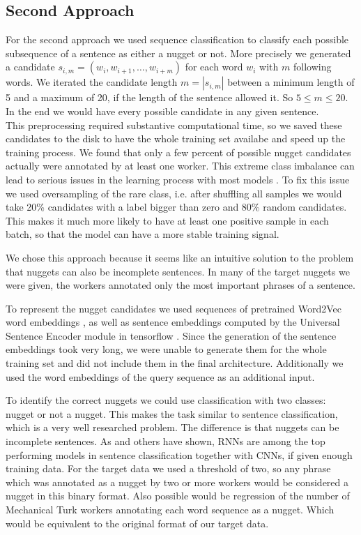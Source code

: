 \documentclass{article}
\begin{document}
 \subsection{Second Approach}
For the second approach we used sequence classification to classify each possible subsequence of a sentence as either a nugget or not. More precisely we generated a candidate $s_{i,m}=(w_i, w_{i+1}, \dots , w_{i+m})$ for each word $w_i$ with $m$ following words. We iterated the candidate length $m=|s_{i,m}|$ between a minimum length of 5 and a maximum of 20, if the length of the sentence allowed it. So $5 \leq m \leq 20$. In the end we would have every possible candidate in any given sentence. \\
This preprocessing required substantive computational time, so we saved these candidates to the disk to have the whole training set availabe and speed up the training process. We found that only a few percent of possible nugget candidates actually were annotated by at least one worker. This extreme class imbalance can lead to serious issues in the learning process with most models \cite{japkowicz2002class}. To fix this issue we used oversampling of the rare class, i.e. after shuffling all samples we would take 20\% candidates with a label bigger than zero and 80\% random candidates. This makes it much more likely to have at least one positive sample in each batch, so that the model can have a more stable training signal.

We chose this approach because it seems like an intuitive solution to the problem that nuggets can also be incomplete sentences. In many of the target nuggets we were given, the workers annotated only the most important phrases of a sentence.

To represent the nugget candidates we used sequences of pretrained Word2Vec word embeddings \cite{w2v}, as well as sentence embeddings computed by the Universal Sentence Encoder module in tensorflow \cite{universal2018}. Since the generation of the sentence embeddings took very long, we were unable to generate them for the whole training set and did not include them in the final architecture. Additionally we used the word embeddings of the query sequence as an additional input.

To identify the correct nuggets we could use classification with two classes: nugget or not a nugget. This makes the task similar to sentence classification, which is a very well researched problem. The difference is that nuggets can be incomplete sentences. As \citep{zhou2015c} and others have shown, RNNs are among the top performing models in sentence classification together with CNNs, if given enough training data. For the target data we used a threshold of two, so any phrase which was annotated as a nugget by two or more workers would be considered a nugget in this binary format. Also possible would be regression of the number of Mechanical Turk workers annotating each word sequence as a nugget. Which would be equivalent to the original format of our target data.\\
\end{document}
